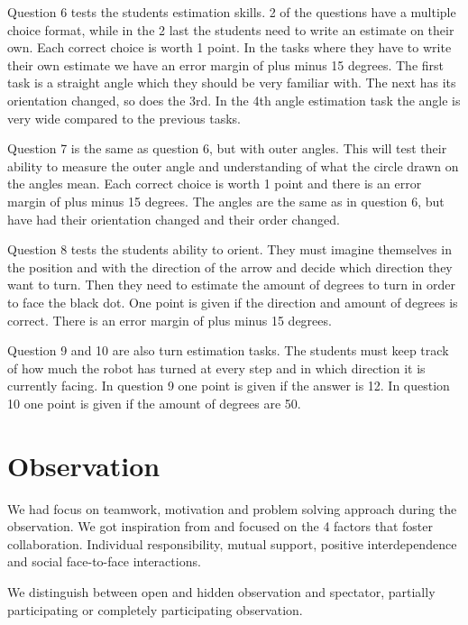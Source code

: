 \bigskip\noindent
Question 6 tests the students estimation skills. 2 of the questions have a multiple choice format, while in the 2 last the students need to write an estimate on their own. Each correct choice is worth 1 point. In the tasks where they have to write their own estimate we have an error margin of plus minus 15 degrees. The first task is a straight angle which they should be very familiar with. The next has its orientation changed, so does the 3rd. In the 4th angle estimation task the angle is very wide compared to the previous tasks. 

\bigskip\noindent
Question 7 is the same as question 6, but with outer angles. This will test their ability to measure the outer angle and understanding of what the circle drawn on the angles mean. Each correct choice is worth 1 point and there is an error margin of plus minus 15 degrees. The angles are the same as in question 6, but have had their orientation changed and their order changed. 

\bigskip\noindent
Question 8 tests the students ability to orient. They must imagine themselves in the position and with the direction of the arrow and decide which direction they want to turn. Then they need to estimate the amount of degrees to turn in order to face the black dot. One point is given if the direction and amount of degrees is correct. There is an error margin of plus minus 15 degrees. 

\bigskip\noindent
Question 9 and 10 are also turn estimation tasks. The students must keep track of how much the robot has turned at every step and in which direction it is currently facing. In question 9 one point is given if the answer is 12. In question 10 one point is given if the amount of degrees are 50. 

\section{Observation}
We had focus on teamwork, motivation and problem solving approach during the observation. We got inspiration from \cite{mitnik2009collaborative} and focused on the 4 factors that foster collaboration. Individual responsibility, mutual support, positive interdependence and social face-to-face interactions.

We distinguish between open and hidden observation and spectator, partially participating or completely participating observation.